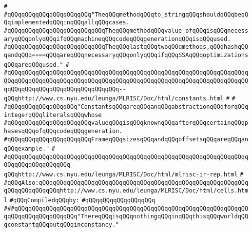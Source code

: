 \verb|#|\newline
\verb|#qQQqqQQqqQQqqQQqqQQqqQQq"TheqQQqmethodqQQqto_stringqQQqshouldqQQqbeqQQqimplementedqQQqinqQQqallqQQqcases.|\newline
\verb|#qQQqqQQqqQQqqQQqqQQqqQQqqQQqTheqQQqmethodqQQqvalue_ofqQQqisqQQqnecessaryqQQqonlyqQQqifqQQqmachineqQQqcodeqQQqgenerationqQQqisqQQqused.|\newline
\verb|#qQQqqQQqqQQqqQQqqQQqqQQqqQQqTheqQQqlastqQQqtwoqQQqmethods,qQQqhashqQQqandqQQq====qQQqareqQQqnecessaryqQQqonlyqQQqifqQQqSSAqQQqoptimizationsqQQqareqQQqused."|\newline
\verb|#|\newline
\verb|#qQQqqQQqqQQqqQQqqQQqqQQqqQQqqQQqqQQqqQQqqQQqqQQqqQQqqQQqqQQqqQQqqQQqqQQqqQQqqQQqqQQqqQQqqQQqqQQqqQQqqQQqqQQqqQQqqQQqqQQqqQQqqQQqqQQqqQQqqQQqqQQqqQQqqQQqqQQqqQQqqQQqqQQqqQQq--qQQqhttp://www.cs.nyu.edu/leunga/MLRISC/Doc/html/constants.html|\newline
\verb|#|\newline
\verb|#|\newline
\verb|#qQQqqQQqqQQqqQQqqQQq"ConstantsqQQqareqQQqanqQQqabstractionqQQqforqQQqintegerqQQqliteralsqQQqwhose|\newline
\verb|#qQQqqQQqqQQqqQQqqQQqqQQqvalueqQQqisqQQqknownqQQqafterqQQqcertainqQQqphasesqQQqofqQQqcodeqQQqgeneration.|\newline
\verb|#qQQqqQQqqQQqqQQqqQQqqQQqFrameqQQqsizesqQQqandqQQqoffsetsqQQqareqQQqanqQQqexample."|\newline
\verb|#|\newline
\verb|#qQQqqQQqqQQqqQQqqQQqqQQqqQQqqQQqqQQqqQQqqQQqqQQqqQQqqQQqqQQqqQQqqQQqqQQqqQQqqQQqqQQqqQQq--qQQqhttp://www.cs.nyu.edu/leunga/MLRISC/Doc/html/mlrisc-ir-rep.html|\newline
\verb|#|\newline
\verb|#qQQqAlso:qQQqqQQqqQQqqQQqqQQqqQQqqQQqqQQqqQQqqQQqqQQqqQQqqQQqqQQqqQQqqQQqqQQqqQQqqQQqhttp://www.cs.nyu.edu/leunga/MLRISC/Doc/html/cells.html|\newline
\newline
\verb|#qQQqCompiledqQQqby:|\newline
\verb|#qQQqqQQqqQQqqQQqqQQq|\newline
\newline
\newline
\newline
\verb|###qQQqqQQqqQQqqQQqqQQqqQQqqQQqqQQqqQQqqQQqqQQqqQQqqQQqqQQqqQQqqQQqqQQqqQQqqQQqqQQqqQQqqQQq"ThereqQQqisqQQqnothingqQQqinqQQqthisqQQqworldqQQqconstantqQQqbutqQQqinconstancy."|\newline
